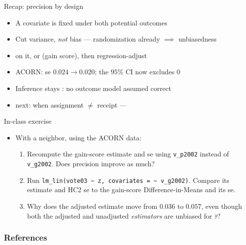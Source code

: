 \documentclass[table, xcolor = {dvipsnames}, 9pt]{beamer}
\theoremstyle{plain}
\newcommand{\mh}[1]{{\color{magenta}{#1}}}
\begin{document}
\begin{frame}[t]{Recap: precision by design}
\vfill
\begin{itemize} \vfill
\item A \mh{baseline} covariate is fixed under both potential outcomes \vfill
\item Cut variance, \emph{not} bias --- randomization already $\implies$ unbiasedness \vfill
\item \mh{Block} on it, or \mh{rescale} (gain score), then regression-adjust \citep{lin2013} \vfill
\item ACORN: se $0.024 \to 0.020$; the $95\%$ CI now excludes $0$ \vfill
\item Inference stays \mh{design-based}: no outcome model assumed correct \vfill
\item[] next: when assignment $\neq$ receipt --- \mh{noncompliance} \vfill
\end{itemize} \vfill
\end{frame}
\begin{frame}[t]{In-class exercise}
\vfill
\begin{itemize} \vfill
\item With a neighbor, using the ACORN data: \vfill
\begin{enumerate} \vfill
\item Recompute the gain-score estimate and se using \texttt{v\_p2002} instead of \texttt{v\_g2002}. Does precision improve as much? \vfill
\item Run \texttt{lm\_lin(vote03 \textasciitilde\ z, covariates = \textasciitilde\ v\_g2002)}. Compare its estimate and HC2 se to the gain-score Difference-in-Means and its se. \vfill
\item Why does the adjusted estimate move from $0.036$ to $0.057$, even though both the adjusted and unadjusted \emph{estimators} are unbiased for $\bar{\tau}$? \vfill
\end{enumerate} \vfill
\end{itemize} \vfill
\end{frame}
\begin{frame}[allowframebreaks]
\frametitle{References}
\scriptsize


\end{frame}
\end{document}
